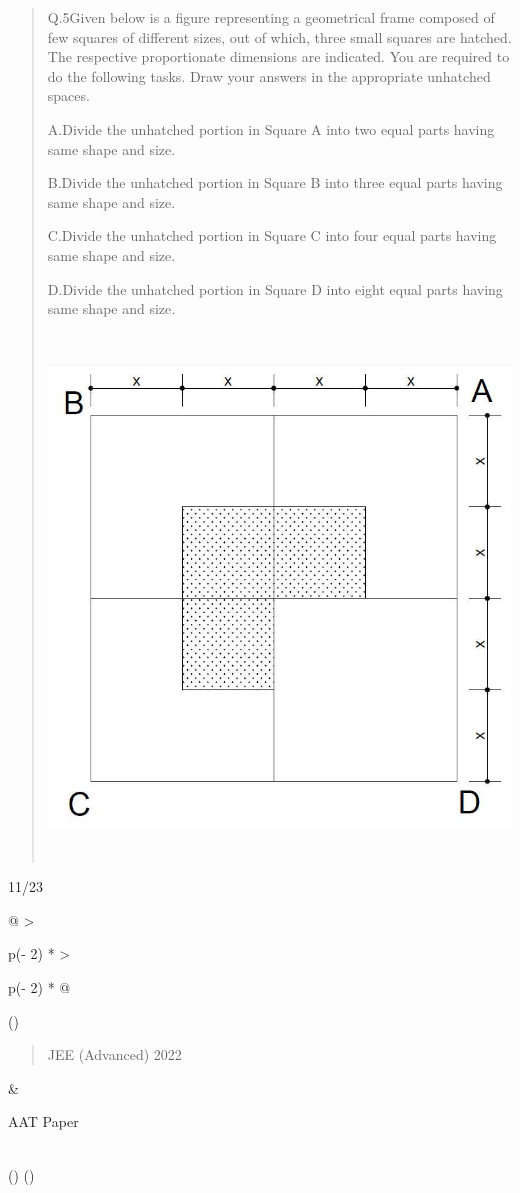 \documentclass[
]{article}
\begin{document}
\begin{quote}
Q.5Given below is a figure representing a geometrical frame composed of
few squares of different sizes, out of which, three small squares are
hatched. The respective proportionate dimensions are indicated. You are
required to do the following tasks. Draw your answers in the appropriate
unhatched spaces.

A.Divide the unhatched portion in Square A into two equal parts having
same shape and size.

B.Divide the unhatched portion in Square B into three equal parts having
same shape and size.

C.Divide the unhatched portion in Square C into four equal parts having
same shape and size.

D.Divide the unhatched portion in Square D into eight equal parts having
same shape and size\emph{.}

\includegraphics[width=5.47917in,height=5.47778in]{vertopal_2361032064654423b71b7db67d98c753/media/image12.png}
\end{quote}

11/23

\begin{longtable}[]{@{}
  >{\raggedright\arraybackslash}p{(\columnwidth - 2\tabcolsep) * }
  >{\raggedright\arraybackslash}p{(\columnwidth - 2\tabcolsep) * }@{}}
\toprule()
\begin{minipage}[b]{\linewidth}\raggedright
\begin{quote}
JEE (Advanced) 2022
\end{quote}
\end{minipage} & \begin{minipage}[b]{\linewidth}\raggedright
AAT Paper
\end{minipage} \\
\midrule()
\endhead
\bottomrule()
\end{longtable}
\end{document}
